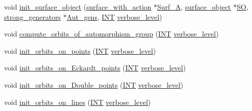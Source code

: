 \begin{DoxyCompactItemize}
\item 
void \mbox{\hyperlink{classsurface__object__with__action_addc93dd533dbceb5c024c66ee1936d35}{init\+\_\+surface\+\_\+object}} (\mbox{\hyperlink{classsurface__with__action}{surface\+\_\+with\+\_\+action}} $\ast$\mbox{\hyperlink{classsurface__object__with__action_af67a9dfb692ea4ec1b68f77c76ee68d8}{Surf\+\_\+A}}, \mbox{\hyperlink{classsurface__object}{surface\+\_\+object}} $\ast$\mbox{\hyperlink{classsurface__object__with__action_a7ff25cc66e0b5f1b8da7b18b7dff7e3f}{SO}}, \mbox{\hyperlink{classstrong__generators}{strong\+\_\+generators}} $\ast$\mbox{\hyperlink{classsurface__object__with__action_ae839ddd92faa0cb8a5edf27505b3e43e}{Aut\+\_\+gens}}, \mbox{\hyperlink{galois_8h_a09fddde158a3a20bd2dcadb609de11dc}{I\+NT}} \mbox{\hyperlink{simeon_8_c_a818073fbcc2f439e7c56952f67386122}{verbose\+\_\+level}})
\item 
void \mbox{\hyperlink{classsurface__object__with__action_a74fe6a01c7d28a4fd30e601824d62c27}{compute\+\_\+orbits\+\_\+of\+\_\+automorphism\+\_\+group}} (\mbox{\hyperlink{galois_8h_a09fddde158a3a20bd2dcadb609de11dc}{I\+NT}} \mbox{\hyperlink{simeon_8_c_a818073fbcc2f439e7c56952f67386122}{verbose\+\_\+level}})
\item 
void \mbox{\hyperlink{classsurface__object__with__action_af409fc1a4a148cb138ceac1bdedf3d8a}{init\+\_\+orbits\+\_\+on\+\_\+points}} (\mbox{\hyperlink{galois_8h_a09fddde158a3a20bd2dcadb609de11dc}{I\+NT}} \mbox{\hyperlink{simeon_8_c_a818073fbcc2f439e7c56952f67386122}{verbose\+\_\+level}})
\item 
void \mbox{\hyperlink{classsurface__object__with__action_adb4f53b56c7d046331cd6f7160c88199}{init\+\_\+orbits\+\_\+on\+\_\+\+Eckardt\+\_\+points}} (\mbox{\hyperlink{galois_8h_a09fddde158a3a20bd2dcadb609de11dc}{I\+NT}} \mbox{\hyperlink{simeon_8_c_a818073fbcc2f439e7c56952f67386122}{verbose\+\_\+level}})
\item 
void \mbox{\hyperlink{classsurface__object__with__action_ab1aa645b1dbce2a3cfbf1ec80194fb02}{init\+\_\+orbits\+\_\+on\+\_\+\+Double\+\_\+points}} (\mbox{\hyperlink{galois_8h_a09fddde158a3a20bd2dcadb609de11dc}{I\+NT}} \mbox{\hyperlink{simeon_8_c_a818073fbcc2f439e7c56952f67386122}{verbose\+\_\+level}})
\item 
void \mbox{\hyperlink{classsurface__object__with__action_a774d7cd436a671bafdf364400a233db5}{init\+\_\+orbits\+\_\+on\+\_\+lines}} (\mbox{\hyperlink{galois_8h_a09fddde158a3a20bd2dcadb609de11dc}{I\+NT}} \mbox{\hyperlink{simeon_8_c_a818073fbcc2f439e7c56952f67386122}{verbose\+\_\+level}})
\item 

\end{DoxyCompactItemize}
